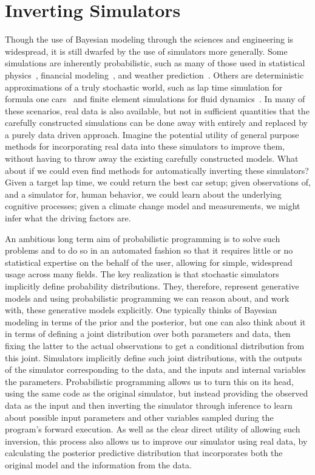 
\section{Inverting Simulators}
\label{sec:probprog:inv}

Though the use of Bayesian modeling through the sciences and engineering is widespread,
it is still dwarfed by the use of simulators more generally.  Some simulations are inherently
probabilistic, such as many of those used in statistical physics~\citep{landau2014guide},
 financial modeling~\citep{jackel2002monte}, and weather prediction~\citep{evensen1994sequential}.  
 Others are deterministic approximations
of a truly stochastic world, such as lap time simulation for formula one cars~\citep{perantoni2014optimal}
and finite element simulations for fluid dynamics~\citep{versteeg2007introduction}.
In many of these scenarios, real data is also available, but not in sufficient quantities that the carefully
constructed simulations can be done away with entirely and replaced by a purely data driven
approach.  
Imagine the potential utility of general purpose methods for incorporating real data
into these simulators to improve them, without having to throw away the existing carefully constructed models.  
What about if we could even find methods for automatically
inverting these simulators?  Given a target lap time, we could return the best car setup; given observations
of, and a simulator for, human behavior, we could learn about the underlying cognitive processes; given
a climate change model and measurements, we might infer what the driving factors are.  

An ambitious long
term aim of probabilistic programming is to solve such problems and to do so in an automated fashion
so that it requires little or no statistical expertise on the behalf of the user, allowing for simple, widespread usage
across many fields.  The key realization is that stochastic simulators implicitly define probability distributions.
They, therefore, represent generative models and using probabilistic programming we can reason about, and
work with, these generative models explicitly.  One typically thinks of Bayesian modeling in terms of the
prior and the posterior, but one can also think about it in terms of defining a joint distribution over
both parameters and data, then fixing the latter to the actual observations to get a conditional distribution from
this joint.  Simulators implicitly define such joint distributions, with the outputs of the simulator corresponding
to the data, and the inputs and internal variables the parameters.  Probabilistic programming allows us to turn this on its head,
using the same code as the original simulator, but instead providing the observed data as the input and
then inverting the simulator through inference to learn about possible input parameters and other 
variables sampled during the program's forward execution.  
As well as the clear direct utility of allowing such inversion, this process also allows us to improve
our simulator using real data, by calculating the posterior predictive distribution that incorporates both
the original model and the information from the data.

